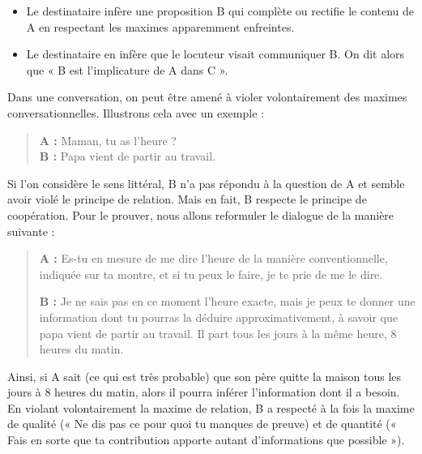 \begin{itemize}
\item Le destinataire infère une proposition B qui complète ou rectifie le contenu de A en respectant les maximes apparemment enfreintes.
\item Le destinataire en infère que le locuteur visait communiquer B. On dit alors que « B est l’implicature de A dans C ».
\end{itemize}

Dans une conversation, on peut être amené à violer volontairement des maximes conversationnelles. Illustrons cela avec un exemple :
\begin{quote}
\textbf{A :} Maman, tu as l’heure ?\\
\textbf{B :} Papa vient de partir au travail.
\end{quote}
Si l’on considère le sens littéral, B n’a pas répondu à la question de A et semble avoir violé le principe de relation. Mais en fait, B respecte le principe de coopération. Pour le prouver, nous allons reformuler le dialogue de la manière suivante :
\begin{quote}
\textbf{A :} Es-tu en mesure de me dire l’heure de la manière conventionnelle, indiquée sur ta montre, et si tu peux le faire, je te prie de me le dire.

\textbf{B :} Je ne sais pas en ce moment l’heure exacte, mais je peux te donner une information dont tu pourras la déduire approximativement, à savoir que papa vient de partir au travail. Il part tous les jours à la même heure, 8 heures du matin.
\end{quote}
Ainsi, si A sait (ce qui est très probable) que son père quitte la maison tous les jours à 8 heures du matin, alors il pourra inférer l’information dont il a besoin. En violant volontairement la maxime de relation, B a respecté à la fois la maxime de qualité (« Ne dis pas ce pour quoi tu manques de preuve) et de quantité (« Fais en sorte que ta contribution apporte autant d’informations que possible »).

